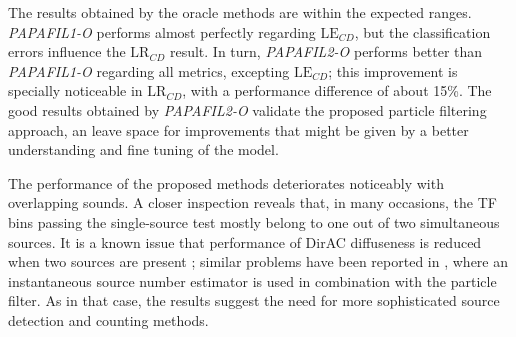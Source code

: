 The results obtained by the oracle methods are within the expected ranges. \textit{PAPAFIL1-O} performs almost perfectly regarding $\text{LE}_{CD}$, but the classification errors influence the $\text{LR}_{CD}$ result.
In turn, \textit{PAPAFIL2-O} performs better than \textit{PAPAFIL1-O} regarding all metrics, excepting $\text{LE}_{CD}$; this improvement is specially noticeable in $\text{LR}_{CD}$, with a performance difference of about 15\%.
The good results obtained by \textit{PAPAFIL2-O} validate the proposed particle filtering approach, an leave space for improvements that might be given by a better understanding and fine tuning of the model.


The performance of the proposed methods deteriorates noticeably with overlapping sounds.
A closer inspection reveals that, in many occasions, the TF bins passing the single-source test mostly belong to one out of two simultaneous sources. 
It is a known issue that performance of DirAC diffuseness is reduced when two sources are present \cite{epain2016spherical}; similar problems have been reported in \cite{adavanne2019localization}, where an instantaneous source number estimator is used in combination with the particle filter.
As in that case, the results suggest the need for more sophisticated source detection and counting methods. 



